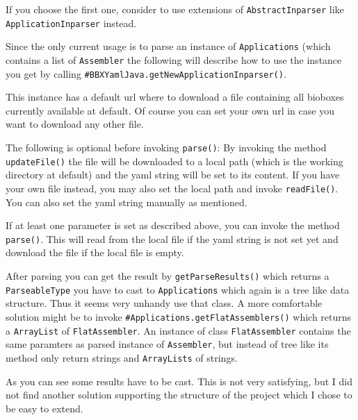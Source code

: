 \documentclass[
	twoside,
	fontsize=12pt,
	headsepline,
	cleardoublepage=empty,
	numbers=noenddot,
	bibliography=totoc,
]{scrbook}
\newcommand{\code}[1]{\texttt{#1}}
\begin{document}
If you choose the first one, consider to use extensions of \code{AbstractInparser} like \code{ApplicationInparser} instead.

Since the only current usage is to parse an instance of \code{Applications} (which contains a list of \code{Assembler} the following will describe how to use the instance you get by calling \code{\#BBXYamlJava.getNewApplicationInparser()}.

This instance has a default url where to download a file containing all bioboxes currently available \cite{AssemblerList} at default. Of course you can set your own url in case you want to download any other file.

The following is optional before invoking \code{parse()}: By invoking the method \\ \code{updateFile()} the file will be downloaded to a local path (which is the working directory at default) and the yaml string will be set to its content. 
If you have your own file instead, you may also set the local path and invoke \code{readFile()}. You can also set the yaml string manually as mentioned. 

If at least one parameter is set as described above, you can invoke the method \code{parse()}. This will read from the local file if the yaml string is not set yet and download the file if the local file is empty. 

After parsing you can get the result by \code{getParseResults()} which returns a \\ \code{ParseableType} you have to cast to \code{Applications} which again is a tree like data structure. Thus it seems very unhandy use that class. A more comfortable solution might be to invoke \code{\#Applications.getFlatAssemblers()} which returns a \code{ArrayList} of \code{FlatAssembler}. An instance of class \code{FlatAssembler} contains the same paramters as parsed instance of \code{Assembler}, but instead of tree like its method only return strings and \code{ArrayLists} of strings.

As you can see some results have to be cast. This is not very satisfying, but I did not find another solution supporting the structure of the project which I chose to be easy to extend. 

\printbibliography



\thispagestyle{empty}
\end{document}
